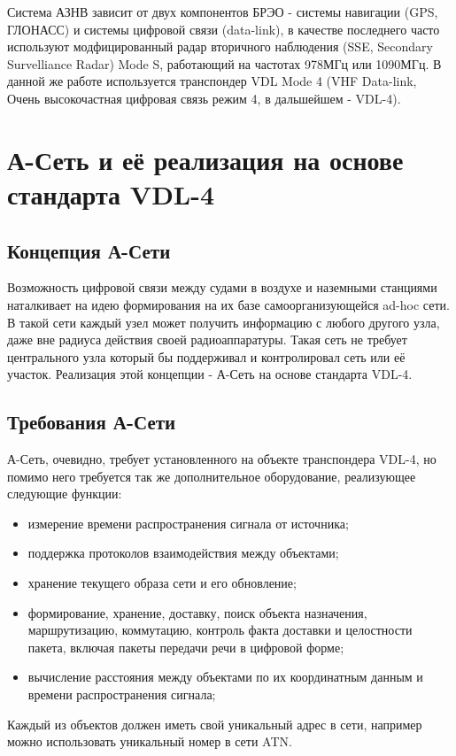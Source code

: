 \documentclass[a4paper,12pt]{report} %
\begin{document}
Система АЗНВ зависит от двух компонентов БРЭО - системы навигации (GPS, ГЛОНАСС)
и системы цифровой связи (data-link), в качестве последнего часто используют
модфицированный радар вторичного наблюдения (SSE, Secondary Survelliance Radar)
Mode S, работающий на частотах 978МГц или 1090МГц. В данной же работе
используется транспондер VDL Mode 4 (VHF Data-link, Очень высокочастная цифровая
связь режим 4, в дальшейшем - VDL-4).
\newpage
\chapter{А-Сеть и её реализация на основе стандарта VDL-4} %

\section{Концепция А-Сети}
Возможность цифровой связи между судами в воздухе и наземными станциями
наталкивает на идею формирования на их базе самоорганизующейся ad-hoc сети. В
такой сети каждый узел может получить информацию с любого другого узла, даже вне
радиуса действия своей радиоаппаратуры. Такая сеть не требует центрального узла
который бы поддерживал и контролировал сеть или её участок. Реализация этой
концепции - А-Сеть на основе стандарта VDL-4.

\section{Требования А-Сети}
А-Сеть, очевидно, требует установленного на объекте транспондера VDL-4, но
помимо него требуется так же дополнительное оборудование, реализующее следующие
функции:
\begin{itemize}
\item измерение времени распространения сигнала от источника;
\item поддержка протоколов взаимодействия между объектами;
\item хранение текущего образа сети и его обновление;
\item формирование, хранение, доставку, поиск объекта назначения, маршрутизацию,
  коммутацию, контроль факта доставки и целостности пакета, включая пакеты
  передачи речи в цифровой форме;
\item вычисление расстояния между объектами по их координатным данным и времени
  распространения сигнала;
\end{itemize}

Каждый из объектов должен иметь свой уникальный адрес в сети, например можно
использовать уникальный номер в сети ATN.
\end{document}
